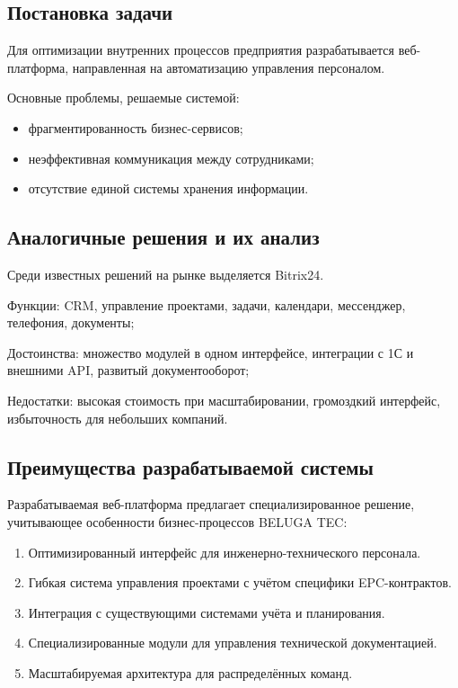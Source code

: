 \subsection{Постановка задачи}

Для оптимизации внутренних процессов предприятия разрабатывается веб-платформа, направленная на автоматизацию управления персоналом. 

Основные проблемы, решаемые системой:

\begin{itemize}
  \item фрагментированность бизнес-сервисов;
  \item неэффективная коммуникация между сотрудниками;
  \item отсутствие единой системы хранения информации.
\end{itemize}

\subsection{Аналогичные решения и их анализ}

Среди известных решений на рынке выделяется Bitrix24.

Функции: CRM, управление проектами, задачи, календари, мессенджер, телефония, документы;

Достоинства: множество модулей в одном интерфейсе, интеграции с 1С и внешними API, развитый документооборот;

Недостатки: высокая стоимость при масштабировании, громоздкий интерфейс, избыточность для небольших компаний.


\subsection{Преимущества разрабатываемой системы}

Разрабатываемая веб-платформа предлагает специализированное решение, учитывающее особенности бизнес-процессов BELUGA TEC:

\begin{enumerate}
  \item Оптимизированный интерфейс для инженерно-технического персонала.
  \item Гибкая система управления проектами с учётом специфики EPC-контрактов.
  \item Интеграция с существующими системами учёта и планирования.
  \item Специализированные модули для управления технической документацией.
  \item Масштабируемая архитектура для распределённых команд.
\end{enumerate}

